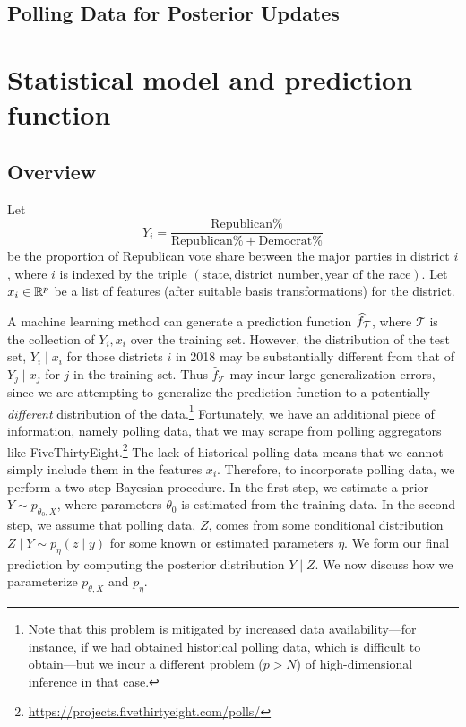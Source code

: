 \documentclass[11pt]{article}
\begin{document}
\subsection{Polling Data for Posterior Updates}

\section{Statistical model and prediction function}
\label{sec:model}
\subsection{Overview}
Let \[Y_i = \frac{\text{Republican}\% }{\text{Republican}\% + \text{Democrat}\%}\] be the proportion of Republican vote share between the major parties in district $i$, where $i$ is indexed by the triple $(\text{state}, \text{district number}, \text{year of the race})$.
Let $x_i\in \R^p$ be a list of features (after suitable basis transformations)
for the district. 

A machine learning method can generate a prediction function $\hat f_{\cal T}$,
where $\mathcal T$ is the collection of $Y_i, x_i$ over the training set.
However, the
distribution of the test set, $Y_i \mid x_i$ for those districts $i$ in 2018 may
be
substantially different from that of $Y_j \mid x_j$ for $j$ in the training
set. Thus $\hat f_{\mathcal T}$ may incur large generalization errors, since we
are attempting to generalize the prediction function to a potentially 
\emph{different}
distribution
of the data.\footnote{Note that this problem is mitigated by increased data
availability---for instance, if we had obtained historical polling data,
which is difficult to obtain---but we incur a different problem ($p > N$) of
high-dimensional
inference in that case.} Fortunately, we have an additional piece of
information, namely polling data, that we may scrape from polling aggregators
like
FiveThirtyEight.\footnote{\url{https://projects.fivethirtyeight.com/polls/}} The
lack of historical polling data means that we cannot simply include them in the
features $x_i$. Therefore, to incorporate polling data, we perform a two-step
Bayesian procedure. In the first step, we estimate a prior $Y \sim p_{\theta_0,
X}$, where parameters $\theta_0$ is estimated from the training data. In the
second step, we assume that polling data, $Z$, comes from some conditional
distribution $Z \mid Y \sim p_{\eta}(z\mid y)$ for some known or
estimated parameters
$\eta$. We form our final prediction by computing the posterior distribution $Y
\mid Z$. We now discuss how we parameterize $p_{\theta, X}$ and $p_\eta$.
\end{document}
